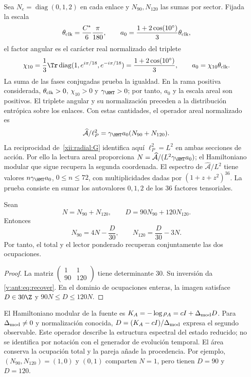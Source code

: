 Sea $N_e=\operatorname{diag}(0,1,2)$ en cada enlace y
$N_{90},N_{120}$ las sumas por sector. Fijada la escala
\[
\theta_{\rm clk}=\frac{C^*}{6}\frac{\pi}{180},\qquad
a_0=\frac{1+2\cos(10^\circ)}3\theta_{\rm clk},
\]
el factor angular es el carácter real normalizado del triplete
\begin{equation}
 \chi_{10}=\frac13\Tr\operatorname{diag}
       (1,e^{i\pi/18},e^{-i\pi/18})
 =\frac{1+2\cos(10^\circ)}3,
 \qquad a_0=\chi_{10}\theta_{\rm clk}.
 \label{v:ant:eq:ii-area-caracter-triplete}
\end{equation}
La suma de las fases conjugadas prueba la igualdad. En la rama positiva
considerada, \(\theta_{\rm clk}>0\), \(\chi_{10}>0\) y
\(\gamma_{\HMT}>0\); por tanto, \(a_0\) y la escala areal son
positivos. El triplete angular y su normalización preceden a la
distribución entrópica sobre los enlaces. Con estas cantidades,
el operador areal normalizado es
\[
\widehat{\mathcal A}/\ell_P^2
=\gamma_{\HMT}a_0(N_{90}+N_{120}).
\]
La reciprocidad de~\eqref{xii:radial:G} identifica aquí
\(\ell_P^2=L^2\) en ambas secciones de acción. Por ello la lectura
areal proporciona \(N=\widehat{\mathcal A}/(L^2\gamma_{\HMT}a_0)\);
el Hamiltoniano modular que sigue recupera la segunda coordenada.
El espectro de \(\widehat{\mathcal A}/L^2\) tiene valores $n\gamma_{\HMT}a_0$, $0\le n\le72$,
con multiplicidades dadas por $(1+z+z^2)^{36}$.
La prueba consiste en sumar los autovalores $0,1,2$ de los
36 factores tensoriales.

\begin{theorem}
Sean
\[
N=N_{90}+N_{120},\qquad D=90N_{90}+120N_{120}.
\]
Entonces
\begin{equation}
N_{90}=4N-\frac D{30},\qquad
N_{120}=\frac D{30}-3N.
\label{v:ant:eq:recover}
\end{equation}
Por tanto, el total y el lector ponderado recuperan conjuntamente
las dos ocupaciones.
\end{theorem}
\begin{proof}
La matriz $\left(\begin{smallmatrix}1&1\\90&120\end{smallmatrix}\right)$
tiene determinante $30$. Su inversión da \eqref{v:ant:eq:recover}.
En el dominio de ocupaciones enteras, la imagen satisface
$D\in30\Z$ y $90N\le D\le120N$.
\end{proof}

El Hamiltoniano modular de la fuente es
$K_A=-\log\rho_A=cI+\Delta_{\rm mod}D$.
Para $\Delta_{\rm mod}\ne0$ y normalización conocida,
$D=(K_A-cI)/\Delta_{\rm mod}$ expresa el segundo observable.
Este operador describe la estructura espectral del estado reducido;
no se identifica por notación con el generador de evolución temporal.
El área conserva la ocupación total y la pareja añade la procedencia.
Por ejemplo, $(N_{90},N_{120})=(1,0)$ y $(0,1)$ comparten $N=1$,
pero tienen $D=90$ y $D=120$.

